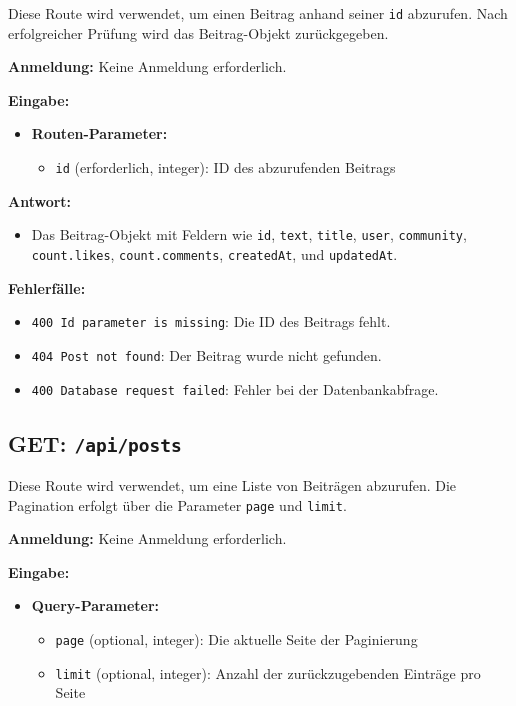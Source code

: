 \documentclass[a4paper,12pt]{article}
\begin{document}
Diese Route wird verwendet, um einen Beitrag anhand seiner \texttt{id}
abzurufen. Nach erfolgreicher Prüfung wird das Beitrag-Objekt zurückgegeben.

\textbf{Anmeldung:} Keine Anmeldung erforderlich.

\textbf{Eingabe:}
\begin{itemize}
    \item \textbf{Routen-Parameter:}
    \begin{itemize}
        \item \texttt{id} (erforderlich, integer):
            ID des abzurufenden Beitrags
    \end{itemize}
\end{itemize}

\textbf{Antwort:}
\begin{itemize}
    \item Das Beitrag-Objekt mit Feldern wie
        \texttt{id},
        \texttt{text},
        \texttt{title},
        \texttt{user},
        \texttt{community},
        \texttt{count.likes},
        \texttt{count.comments},
        \texttt{createdAt}, und
        \texttt{updatedAt}.
\end{itemize}

\textbf{Fehlerfälle:}
\begin{itemize}
    \item \texttt{400 Id parameter is missing}:
        Die ID des Beitrags fehlt.
    \item \texttt{404 Post not found}:
        Der Beitrag wurde nicht gefunden.
    \item \texttt{400 Database request failed}:
        Fehler bei der Datenbankabfrage.
\end{itemize}

\subsection{GET: \texttt{/api/posts}}

Diese Route wird verwendet, um eine Liste von Beiträgen abzurufen. Die
Pagination erfolgt über die Parameter \texttt{page} und \texttt{limit}.

\textbf{Anmeldung:} Keine Anmeldung erforderlich.

\textbf{Eingabe:}
\begin{itemize}
    \item \textbf{Query-Parameter:}
    \begin{itemize}
        \item \texttt{page} (optional, integer):
            Die aktuelle Seite der Paginierung
        \item \texttt{limit} (optional, integer):
            Anzahl der zurückzugebenden Einträge pro Seite
    \end{itemize}
\end{itemize}
\end{document}
